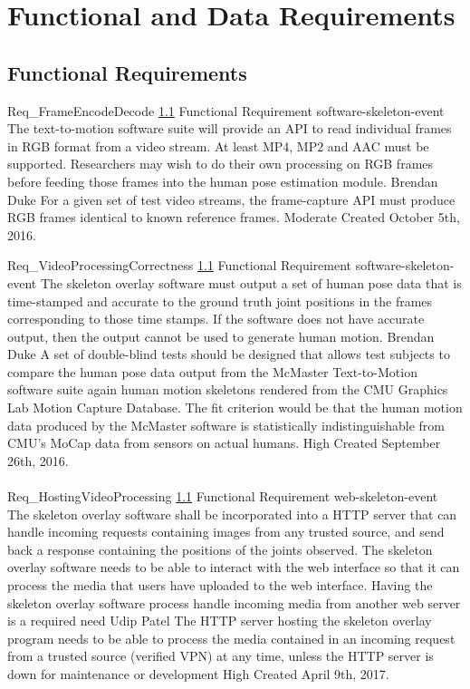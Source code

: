 \documentclass{scrreprt}
\begin{document}
\section{Functional and Data Requirements}

\subsection{Functional Requirements}
\label{req-functional-requirement}

\requirement
{Req_FrameEncodeDecode}
{\ref{req-functional-requirement} Functional Requirement}
{software-skeleton-event}
{The text-to-motion software suite will provide an API to read individual
 frames in RGB format from a video stream. At least MP4, MP2 and AAC must be
 supported.}
{Researchers may wish to do their own processing on RGB frames before feeding
 those frames into the human pose estimation module.}
{Brendan Duke}
{For a given set of test video streams, the frame-capture API must produce RGB
 frames identical to known reference frames.}
{Moderate}
{Created October 5th, 2016.}

\requirement
{Req_VideoProcessingCorrectness}
{\ref{req-functional-requirement} Functional Requirement}
{software-skeleton-event}
{The skeleton overlay software must output a set of human pose data that is
 time-stamped and accurate to the ground truth joint positions in the frames
 corresponding to those time stamps.}
{If the software does not have accurate output, then the output cannot be used
 to generate human motion.}
{Brendan Duke}
{A set of double-blind tests should be designed that allows test subjects to
 compare the human pose data output from the McMaster Text-to-Motion software
 suite again human motion skeletons rendered from the CMU Graphics Lab Motion
 Capture Database. The fit criterion would be that the human motion data
 produced by the McMaster software is statistically indistinguishable from
 CMU's MoCap data from sensors on actual humans.}
{High}
{Created September 26th, 2016.}
\\ \\

\requirement
{Req_HostingVideoProcessing}
{\ref{req-functional-requirement} Functional Requirement}
{web-skeleton-event}
{The skeleton overlay software shall be incorporated into a HTTP server that can handle incoming requests containing images from any trusted source, and send back a response containing the positions of the joints observed.}
{The skeleton overlay software needs to be able to interact with the web interface so that it can process the media that users have uploaded to the web interface. Having the skeleton overlay software process handle incoming media from another web server is a required need }
{Udip Patel}
{The HTTP server hosting the skeleton overlay program needs to be able to process the media contained in an incoming request from a trusted source (verified VPN) at any time, unless the HTTP server is down for maintenance or development}
{High}
{Created April 9th, 2017.}
\\ \\
\end{document}
